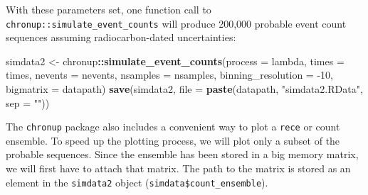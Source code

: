 \documentclass[]{article}
\newenvironment{Shaded}{\begin{snugshade}}{\end{snugshade}}
\newcommand{\KeywordTok}[1]{\textcolor[rgb]{0.13,0.29,0.53}{\textbf{#1}}}
\newcommand{\DataTypeTok}[1]{\textcolor[rgb]{0.13,0.29,0.53}{#1}}
\newcommand{\DecValTok}[1]{\textcolor[rgb]{0.00,0.00,0.81}{#1}}
\newcommand{\StringTok}[1]{\textcolor[rgb]{0.31,0.60,0.02}{#1}}
\newcommand{\OperatorTok}[1]{\textcolor[rgb]{0.81,0.36,0.00}{\textbf{#1}}}
\newcommand{\NormalTok}[1]{#1}
\begin{document}
With these parameters set, one function call to
\texttt{chronup::simulate\_event\_counts} will produce 200,000 probable
event count sequences assuming radiocarbon-dated uncertainties:

\begin{Shaded}
\begin{Highlighting}[]
\NormalTok{simdata2 <-}\StringTok{ }\NormalTok{chronup}\OperatorTok{::}\KeywordTok{simulate_event_counts}\NormalTok{(}\DataTypeTok{process =}\NormalTok{ lambda,}
                                            \DataTypeTok{times =}\NormalTok{ times,}
                                            \DataTypeTok{nevents =}\NormalTok{ nevents,}
                                            \DataTypeTok{nsamples =}\NormalTok{ nsamples,}
                                            \DataTypeTok{binning_resolution =} \DecValTok{-10}\NormalTok{,}
                                            \DataTypeTok{bigmatrix =}\NormalTok{ datapath)}
\KeywordTok{save}\NormalTok{(simdata2,}
    \DataTypeTok{file =} \KeywordTok{paste}\NormalTok{(datapath,}
                \StringTok{"simdata2.RData"}\NormalTok{,}
                \DataTypeTok{sep =} \StringTok{""}\NormalTok{))}
\end{Highlighting}
\end{Shaded}

The \texttt{chronup} package also includes a convenient way to plot a
\texttt{rece} or count ensemble. To speed up the plotting process, we
will plot only a subset of the probable sequences. Since the ensemble
has been stored in a big memory matrix, we will first have to attach
that matrix. The path to the matrix is stored as an element in the
\texttt{simdata2} object (\texttt{simdata\$count\_ensemble}).

\begin{Shaded}
\end{Shaded}
\end{document}
